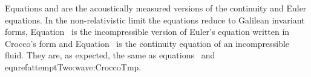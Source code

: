 Equations  and  are the acoustically measured versions of the continuity and Euler equations.
In the non-relativistic limit the equations reduce to Galilean invariant forms, 
Equation~ is the incompressible version of Euler's equation written in Croc\-co's form\cite{Howe1998}
and Equation~ is the continuity equation of an incompressible fluid.
They are, as expected, the same as equations~ and eqnref{attemptTwo:wave:CroccoTmp}.




